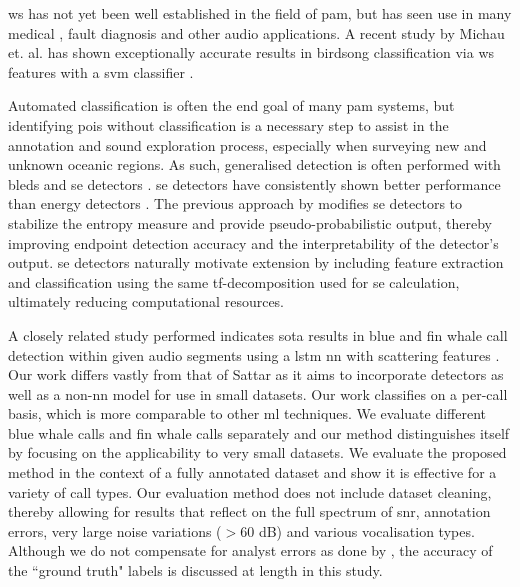 \Ac{ws} has not yet been well established in the field of \ac{pam}, but has seen use in many medical \citep{ws_ecg, ecg_ws_svm}, fault diagnosis \citep{ws_fault_diag} and other audio \citep{ws_speech, ws_audio2, ws_audio} applications. A recent study by Michau et. al. has shown exceptionally accurate results in birdsong classification via \ac{ws} features with a \ac{svm} classifier \citep{scattering_birdsong}.

Automated classification is often the end goal of many \ac{pam} systems, but identifying \acp{poi} without classification is a necessary step to assist in the annotation and sound exploration process, especially when surveying new and unknown oceanic regions. As such, generalised detection is often performed with \acp{bled} and \ac{se} detectors \citep{se_dolphin}. \Ac{se} detectors have consistently shown better performance than energy detectors \citep{se_erbe_king}. The previous approach by \citet{mypaper} modifies \ac{se} detectors to stabilize the entropy measure and provide pseudo-probabilistic output, thereby improving endpoint detection accuracy and the interpretability of the detector's output. \ac{se} detectors naturally motivate extension by including feature extraction and classification using the same \ac{tf}-decomposition used for \ac{se} calculation, ultimately reducing computational resources.

A closely related study performed indicates \ac{sota} results in blue and fin whale call detection within given audio segments using a \ac{lstm} \ac{nn} with scattering features \citep{otherScattering}. Our work differs vastly from that of Sattar as it aims to incorporate detectors as well as a non-\ac{nn} model for use in small datasets. Our work classifies on a per-call basis, which is more comparable to other \ac{ml} techniques. We evaluate different blue whale calls and fin whale calls separately and our method distinguishes itself by focusing on the applicability to very small datasets. We evaluate the proposed method in the context of a fully annotated dataset and show it is effective for a variety of call types. Our evaluation method does not include dataset cleaning, thereby allowing for results that reflect on the full spectrum of \ac{snr}, annotation errors, very large noise variations ($>60$ dB) and various vocalisation types. Although we do not compensate for analyst errors as done by \citet{casey2019}, the accuracy of the ``ground truth" labels is discussed at length in this study.

